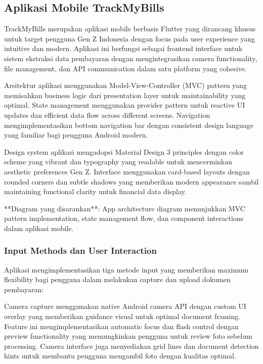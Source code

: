 \subsection{Aplikasi Mobile TrackMyBills}
\label{subsec:aplikasi-mobile-trackmybills}

TrackMyBills merupakan aplikasi mobile berbasis Flutter yang dirancang khusus untuk target pengguna Gen Z Indonesia dengan focus pada user experience yang intuitive dan modern. Aplikasi ini berfungsi sebagai frontend interface untuk sistem ekstraksi data pembayaran dengan mengintegrasikan camera functionality, file management, dan API communication dalam satu platform yang cohesive.

Arsitektur aplikasi menggunakan Model-View-Controller (MVC) pattern yang memisahkan business logic dari presentation layer untuk maintainability yang optimal. State management menggunakan provider pattern untuk reactive UI updates dan efficient data flow across different screens. Navigation mengimplementasikan bottom navigation bar dengan consistent design language yang familiar bagi pengguna Android modern.

Design system aplikasi mengadopsi Material Design 3 principles dengan color scheme yang vibrant dan typography yang readable untuk mencerminkan aesthetic preferences Gen Z. Interface menggunakan card-based layouts dengan rounded corners dan subtle shadows yang memberikan modern appearance sambil maintaining functional clarity untuk financial data display.

**Diagram yang disarankan**: App architecture diagram menunjukkan MVC pattern implementation, state management flow, dan component interactions dalam aplikasi mobile.

\subsubsection{Input Methods dan User Interaction}
\label{subsubsec:input-methods}

Aplikasi mengimplementasikan tiga metode input yang memberikan maximum flexibility bagi pengguna dalam melakukan capture dan upload dokumen pembayaran:

Camera capture menggunakan native Android camera API dengan custom UI overlay yang memberikan guidance visual untuk optimal document framing. Feature ini mengimplementasikan automatic focus dan flash control dengan preview functionality yang memungkinkan pengguna untuk review foto sebelum processing. Camera interface juga menyediakan grid lines dan document detection hints untuk membantu pengguna mengambil foto dengan kualitas optimal.


